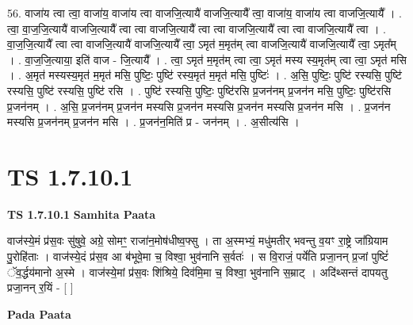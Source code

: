 \documentclass[17pt]{extarticle}
\begin{document}
56. वाजा॑य त्वा त्वा॒ वाजा॑य॒ वाजा॑य त्वा वाजजि॒त्यायै॑ वाजजि॒त्यायै᳚ त्वा॒ वाजा॑य॒ वाजा॑य त्वा वाजजि॒त्यायै᳚ । . त्वा॒ वा॒ज॒जि॒त्यायै॑ वाजजि॒त्यायै᳚ त्वा त्वा वाजजि॒त्यायै᳚ त्वा त्वा वाजजि॒त्यायै᳚ त्वा त्वा वाजजि॒त्यायै᳚ त्वा । . वा॒ज॒जि॒त्यायै᳚ त्वा त्वा वाजजि॒त्यायै॑ वाजजि॒त्यायै᳚ त्वा॒ ऽमृत॑ म॒मृत॑म् त्वा वाजजि॒त्यायै॑ वाजजि॒त्यायै᳚ त्वा॒ ऽमृत᳚म् । . वा॒ज॒जि॒त्याया॒ इति॑ वाज - जि॒त्यायै᳚ । . त्वा॒ ऽमृत॑ म॒मृत॑म् त्वा त्वा॒ ऽमृत॑ मस्य स्य॒मृत॑म् त्वा त्वा॒ ऽमृत॑ मसि । . अ॒मृत॑ मस्यस्य॒मृत॑ म॒मृत॑ मसि॒ पुष्टिः॒ पुष्टि॑ रस्य॒मृत॑ म॒मृत॑ मसि॒ पुष्टिः॑ । . अ॒सि॒ पुष्टिः॒ पुष्टि॑ रस्यसि॒ पुष्टि॑ रस्यसि॒ पुष्टि॑ रस्यसि॒ पुष्टि॑ रसि । . पुष्टि॑ रस्यसि॒ पुष्टिः॒ पुष्टि॑रसि प्र॒जन॑नम् प्र॒जन॑न मसि॒ पुष्टिः॒ पुष्टि॑रसि प्र॒जन॑नम् । . अ॒सि॒ प्र॒जन॑नम् प्र॒जन॑न मस्यसि प्र॒जन॑न मस्यसि प्र॒जन॑न मस्यसि प्र॒जन॑न मसि । . प्र॒जन॑न मस्यसि प्र॒जन॑नम् प्र॒जन॑न मसि । . प्र॒जन॑न॒मिति॑ प्र - जन॑नम् । . अ॒सीत्य॑सि । \newline
\pagebreak
{}
\section*{ TS 1.7.10.1 }

\textbf{TS 1.7.10.1 } \newline
\textbf{Samhita Paata} \newline

वाज॑स्ये॒मं प्र॑स॒वः सु॑षुवे॒ अग्रे॒ सोमꣳ॒॒ राजा॑न॒मोष॑धीष्व॒फ्सु । ता अ॒स्मभ्यं॒ मधु॑मतीर् भवन्तु व॒यꣳ रा॒ष्ट्रे जा᳚ग्रियाम पु॒रोहि॑ताः । वाज॑स्ये॒दं प्र॑स॒व आ ब॑भूवे॒मा च॒ विश्वा॒ भुव॑नानि स॒र्वतः॑ । स वि॒राजं॒ पर्ये॑ति प्रजा॒नन् प्र॒जां पुष्टिं॑ ॅव॒र्द्धय॑मानो अ॒स्मे । वाज॑स्ये॒मां प्र॑स॒वः शि॑श्रिये॒ दिव॑मि॒मा च॒ विश्वा॒ भुव॑नानि स॒म्राट् । अदि॑थ्सन्तं दापयतु प्रजा॒नन् र॒यिं - [ ] \newline

\textbf{Pada Paata} \newline
\end{document}
